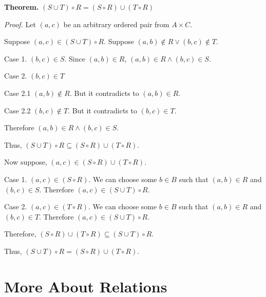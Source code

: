 \documentclass{article}
\newcommand{\vs}{\vspace{30pt}}
\begin{document}
\textbf{Theorem.} $(S \cup T) \circ R = (S \circ R) \cup (T \circ R)$

\textit{Proof.} Let $(a,c)$ be an arbitrary ordered pair from $A \times C$.

Suppose $(a,c) \in (S \cup T) \circ R$. Suppose $(a,b) \notin R \lor (b,c) \notin  T$.

Case 1.
$(b,c) \in S$. Since $(a,b) \in R$, $(a,b) \in R \land (b,c) \in S$.

Case 2.
$(b,c) \in T$

Case 2.1
$(a,b) \notin R$. But it contradicts to $(a,b) \in R$.

Case 2.2
$(b,c) \notin T$. But it contradicts to $(b,c) \in T$.

Therefore $(a,b) \in R \land (b,c) \in S$.

Thus, $(S \cup T) \circ R \subseteq (S \circ R) \cup (T \circ R)$.

Now suppose, $(a,c) \in (S \circ R) \cup (T \circ R)$.

Case 1.
$(a,c) \in (S \circ R)$. We can choose some $b \in B$ such that $(a,b) \in R$ and $(b,c) \in S$. Therefore $(a,c) \in (S \cup T) \circ R$.

Case 2.
$(a,c) \in (T \circ R)$. We can choose some $b \in B$ such that $(a,b) \in R$ and $(b,c) \in T$. Therefore $(a,c) \in (S \cup T) \circ R$.

Therefore, $(S \circ R) \cup (T \circ R) \subseteq (S \cup T) \circ R$.

Thus, $(S \cup T) \circ R = (S \circ R) \cup (T \circ R)$.
\vs
\vs
\vs

\section{More About Relations}
\end{document}
